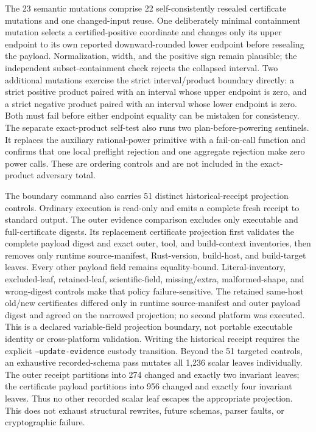 \documentclass[11pt]{article}
\theoremstyle{definition}
\begin{document}
The 23 semantic mutations comprise 22 self-consistently resealed certificate mutations and one
changed-input reuse.  One deliberately minimal containment mutation selects a certified-positive
coordinate and changes only its upper endpoint to its own reported downward-rounded lower
endpoint before resealing the payload.  Normalization, width, and the positive sign remain
plausible; the independent subset-containment check rejects the collapsed interval.
Two additional mutations exercise the strict interval/product boundary directly: a strict
positive product paired with an interval whose upper endpoint is zero, and a strict negative
product paired with an interval whose lower endpoint is zero.  Both must fail before either
endpoint equality can be mistaken for consistency.
The separate exact-product self-test also runs two plan-before-powering sentinels.  It replaces
the auxiliary rational-power primitive with a fail-on-call function and confirms that one local
preflight rejection and one aggregate rejection make zero power calls.  These are ordering
controls and are not included in the exact-product adversary total.

The boundary command also carries 51 distinct historical-receipt projection controls.  Ordinary
execution is read-only and emits a complete fresh receipt to standard output.  The outer evidence
comparison excludes only executable and full-certificate digests.  Its replacement certificate
projection first validates the complete payload digest and exact outer, tool, and build-context
inventories, then removes only runtime source-manifest, Rust-version, build-host, and build-target
leaves.  Every other payload field remains equality-bound.  Literal-inventory, excluded-leaf,
retained-leaf, scientific-field, missing/extra, malformed-shape, and wrong-digest controls make
that policy failure-sensitive.  The retained same-host old/new certificates differed only in
runtime source-manifest and outer payload digest and agreed on the narrowed projection; no second
platform was executed.  This is a declared variable-field projection boundary, not portable
executable identity or cross-platform validation.  Writing the historical receipt requires the
explicit \texttt{--update-evidence} custody transition.
Beyond the 51 targeted controls, an exhaustive recorded-schema pass mutates all 1,236 scalar
leaves individually.  The outer receipt partitions into 274 changed and exactly two invariant
leaves; the certificate payload partitions into 956 changed and exactly four invariant leaves.
Thus no other recorded scalar leaf escapes the appropriate projection.  This does not exhaust
structural rewrites, future schemas, parser faults, or cryptographic failure.
\end{document}

